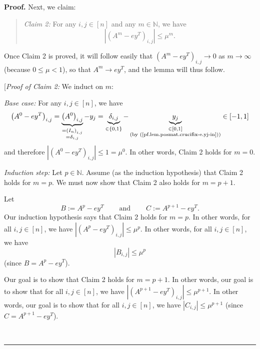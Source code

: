 \documentclass[numbers=enddot,12pt,final,onecolumn,notitlepage]{scrartcl}%
\numberwithin{exer}{subsection}
\theoremstyle{definition}
\newenvironment{statement}{\begin{quote}}{\end{quote}}
\newenvironment{proof}[1][Proof]{\noindent\textbf{#1.} }{\ \rule{0.5em}{0.5em}}
\begin{document}
\begin{proof}
Next, we claim:

\begin{statement}
\textit{Claim 2:} For any $i,j\in\left[  n\right]  $ and any $m\in\mathbb{N}$,
we have%
\[
\left\vert \left(  A^{m}-ey^{T}\right)  _{i,j}\right\vert \leq\mu^{m}.
\]

\end{statement}

Once Claim 2 is proved, it will follow easily that $\left(  A^{m}%
-ey^{T}\right)  _{i,j}\rightarrow0$ as $m\rightarrow\infty$ (because $0\leq
\mu<1$), so that $A^{m}\rightarrow ey^{T}$, and the lemma will thus follow.

[\textit{Proof of Claim 2:} We induct on $m$:

\textit{Base case:} For any $i,j\in\left[  n\right]  $, we have%
\[
\left(  A^{0}-ey^{T}\right)  _{i,j}=\underbrace{\left(  A^{0}\right)  _{i,j}%
}_{\substack{=\left(  I_{n}\right)  _{i,j}\\=\delta_{i,j}}}-y_{j}%
=\underbrace{\delta_{i,j}}_{\in\left\{  0,1\right\}  }-\underbrace{y_{j}%
}_{\substack{\in\left[  0,1\right]  \\\text{(by
(\ref{pf.lem.posmat.crucifix-e.yj-in}))}}}\in\left[  -1,1\right]
\]
and therefore $\left\vert \left(  A^{0}-ey^{T}\right)  _{i,j}\right\vert
\leq1=\mu^{0}$. In other words, Claim 2 holds for $m=0$.

\textit{Induction step:} Let $p\in\mathbb{N}$. Assume (as the induction
hypothesis) that Claim 2 holds for $m=p$. We must now show that Claim 2 also
holds for $m=p+1$.

Let
\[
B:=A^{p}-ey^{T}\ \ \ \ \ \ \ \ \ \ \text{and}\ \ \ \ \ \ \ \ \ \ C:=A^{p+1}%
-ey^{T}.
\]
Our induction hypothesis says that Claim 2 holds for $m=p$. In other words,
for all $i,j\in\left[  n\right]  $, we have $\left\vert \left(  A^{p}%
-ey^{T}\right)  _{i,j}\right\vert \leq\mu^{p}$. In other words, for all
$i,j\in\left[  n\right]  $, we have%
\begin{equation}
\left\vert B_{i,j}\right\vert \leq\mu^{p}
\label{pf.lem.posmat.crucifix-e.c2.IH}%
\end{equation}
(since $B=A^{p}-ey^{T}$).

Our goal is to show that Claim 2 holds for $m=p+1$. In other words, our goal
is to show that for all $i,j\in\left[  n\right]  $, we have $\left\vert
\left(  A^{p+1}-ey^{T}\right)  _{i,j}\right\vert \leq\mu^{p+1}$. In other
words, our goal is to show that for all $i,j\in\left[  n\right]  $, we have
$\left\vert C_{i,j}\right\vert \leq\mu^{p+1}$ (since $C=A^{p+1}-ey^{T}$).


\end{proof}
\end{document}
